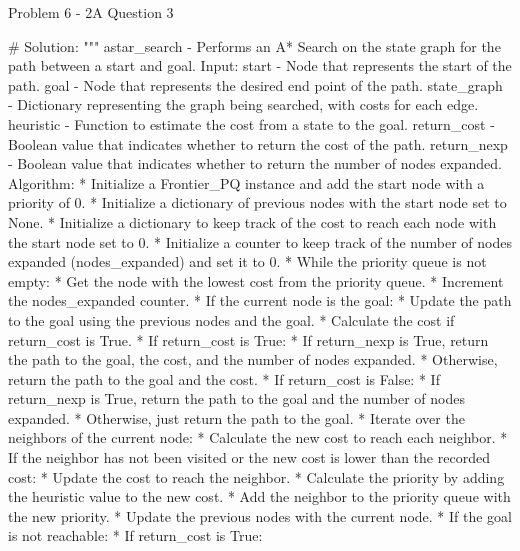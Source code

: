 \begin{problem}{Problem 6 - 2A Question 3}
\begin{highlight}[Solution]
\begin{code}[Python]
    # Solution:
    """ astar_search - Performs an A* Search on the state graph for the path between a start and goal.
        Input:
            start - Node that represents the start of the path.
            goal - Node that represents the desired end point of the path.
            state_graph - Dictionary representing the graph being searched, with costs for each edge.
            heuristic - Function to estimate the cost from a state to the goal.
            return_cost - Boolean value that indicates whether to return the cost of the path.
            return_nexp - Boolean value that indicates whether to return the number of nodes expanded.
        Algorithm:
            * Initialize a Frontier_PQ instance and add the start node with a priority of 0.
            * Initialize a dictionary of previous nodes with the start node set to None.
            * Initialize a dictionary to keep track of the cost to reach each node with the start node set to 0.
            * Initialize a counter to keep track of the number of nodes expanded (nodes_expanded) and set it to 0.
            * While the priority queue is not empty:
                * Get the node with the lowest cost from the priority queue.
                * Increment the nodes_expanded counter.
                * If the current node is the goal:
                    * Update the path to the goal using the previous nodes and the goal.
                    * Calculate the cost if return_cost is True.
                    * If return_cost is True:
                        * If return_nexp is True, return the path to the goal, the cost, and the number of nodes expanded.
                        * Otherwise, return the path to the goal and the cost.
                    * If return_cost is False:
                        * If return_nexp is True, return the path to the goal and the number of nodes expanded.
                        * Otherwise, just return the path to the goal.
                * Iterate over the neighbors of the current node:
                    * Calculate the new cost to reach each neighbor.
                    * If the neighbor has not been visited or the new cost is lower than the recorded cost:
                        * Update the cost to reach the neighbor.
                        * Calculate the priority by adding the heuristic value to the new cost.
                        * Add the neighbor to the priority queue with the new priority.
                        * Update the previous nodes with the current node.
            * If the goal is not reachable:
                * If return_cost is True:

\end{code}
\end{highlight}
\end{problem}
